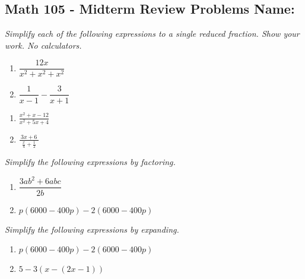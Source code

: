 \documentclass[11pt]{article}
\begin{document}
\pagestyle{empty}
\subsection*{Math 105 - Midterm Review Problems \hfill Name: \underline{\hspace*{2in}}}





\noindent
\textit{Simplify each of the following expressions to a single reduced fraction. Show your work. No calculators.} 
\begin{multicols}{2}
\begin{enumerate}
\item $\dfrac{12x}{x^2+x^2+x^2}$
\item $\dfrac{1}{x-1} - \dfrac{3}{x+1}$
\setcounter{enumCount}{\theenumi}
\end{enumerate}
\end{multicols}
\vfill


\noindent
\begin{multicols}{2}
\begin{enumerate}
\setcounter{enumi}{\theenumCount}
\item $\displaystyle \frac{x^2 + x - 12}{x^2 + 5x + 4}$
\item $\displaystyle \frac{~ 3x+6 ~}{\frac{x}{4}+\frac{1}{2}}$
\setcounter{enumCount}{\theenumi}
\end{enumerate}
\end{multicols}
\vfill

\noindent
\textit{Simplify the following expressions by factoring.} 
\begin{multicols}{2}
\begin{enumerate}
\setcounter{enumi}{\theenumCount}
\item $\dfrac{3ab^2 + 6a b c}{2b}$
\item $p(6000-400p)- 2(6000-400p)$
\setcounter{enumCount}{\theenumi}
\end{enumerate}
\end{multicols}
\vfill

\noindent
\textit{Simplify the following expressions by expanding.} 
\begin{multicols}{2}
\begin{enumerate}
\setcounter{enumi}{\theenumCount}
\item $p(6000-400p)- 2(6000-400p)$
\item $5 - 3(x-(2x-1))$
\setcounter{enumCount}{\theenumi}
\end{enumerate}
\end{multicols}
\vfill
\end{document}
